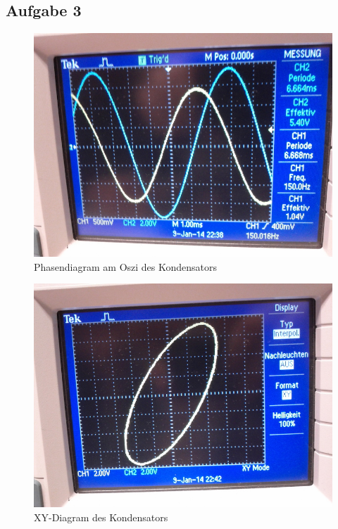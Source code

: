 \documentclass[12pt,a4paper]{article}
\begin{document}
\begin{multicols}{2}
\subsection{Aufgabe 3}
\begin{figure}[H]
	\centering
	\includegraphics[scale=0.25]{./figure/150Hz_kondens.jpg}
	\caption{Phasendiagram am Oszi des Kondensators}
	\label{fig:phase_kondi}
\end{figure}
\begin{figure}[H]
	\centering
	\includegraphics[scale=0.25]{./figure/xy_kondensator.jpg}
	\caption{XY-Diagram des Kondensators}
	\label{fig:xy_kondi}
\end{figure}



\end{multicols}
\end{document}
